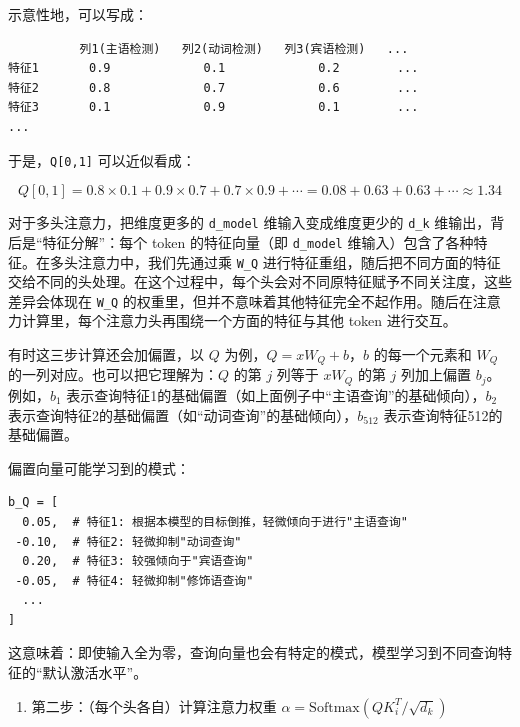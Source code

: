 示意性地，可以写成：

\begin{verbatim}
          列1(主语检测)   列2(动词检测)   列3(宾语检测)   ...
特征1       0.9             0.1             0.2        ...
特征2       0.8             0.7             0.6        ...
特征3       0.1             0.9             0.1        ...
...
\end{verbatim}

于是，\texttt{Q{[}0,1{]}} 可以近似看成：

\[
Q[0,1] = 0.8 \times 0.1 + 0.9 \times 0.7 + 0.7 \times 0.9 + \cdots = 0.08 + 0.63 + 0.63 + \cdots \approx 1.34
\]

对于多头注意力，把维度更多的 \texttt{d\_model} 维输入变成维度更少的 \texttt{d\_k} 维输出，背后是``特征分解''：每个 token 的特征向量（即 \texttt{d\_model} 维输入）包含了各种特征。在多头注意力中，我们先通过乘 \texttt{W\_Q} 进行特征重组，随后把不同方面的特征交给不同的头处理。在这个过程中，每个头会对不同原特征赋予不同关注度，这些差异会体现在 \texttt{W\_Q} 的权重里，但并不意味着其他特征完全不起作用。随后在注意力计算里，每个注意力头再围绕一个方面的特征与其他 token 进行交互。

有时这三步计算还会加偏置，以 \(Q\) 为例，\(Q=xW_Q+b\)，\(b\) 的每一个元素和 \(W_Q\) 的一列对应。也可以把它理解为：\(Q\) 的第 \(j\) 列等于 \(xW_Q\) 的第 \(j\) 列加上偏置 \(b_j\)。例如，\(b_1\) 表示查询特征1的基础偏置（如上面例子中``主语查询''的基础倾向），\(b_2\) 表示查询特征2的基础偏置（如``动词查询''的基础倾向），\(b_{512}\) 表示查询特征512的基础偏置。

偏置向量可能学习到的模式：

\begin{verbatim}
b_Q = [
  0.05,  # 特征1: 根据本模型的目标倒推，轻微倾向于进行"主语查询"
 -0.10,  # 特征2: 轻微抑制"动词查询"
  0.20,  # 特征3: 较强倾向于"宾语查询"
 -0.05,  # 特征4: 轻微抑制"修饰语查询"
  ...
]
\end{verbatim}

这意味着：即使输入全为零，查询向量也会有特定的模式，模型学习到不同查询特征的``默认激活水平''。

\begin{enumerate}
\def\labelenumi{\arabic{enumi}.}
\setcounter{enumi}{1}
\tightlist
\item
  第二步：（每个头各自）计算注意力权重 \(\alpha=\mathrm{Softmax}\left(QK_i^T/\sqrt{d_k}\right)\)
\end{enumerate}

